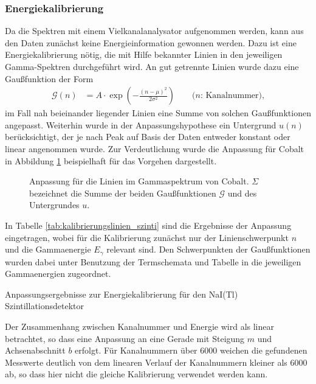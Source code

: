 \documentclass[11pt, a4paper]{article}
\numberwithin{equation}{section}
\begin{document}
\subsubsection{Energiekalibrierung}
\label{sec:kalibrierung_szinti}
Da die Spektren mit einem Vielkanalanalysator aufgenommen werden, kann aus den Daten zunächst keine Energieinformation gewonnen werden.
Dazu ist eine Energiekalibrierung nötig, die mit Hilfe bekannter Linien in den jeweiligen Gamma-Spektren durchgeführt wird.
An gut getrennte Linien wurde dazu eine Gaußfunktion der Form
\begin{align}
\mathcal{G}(n) &= A \cdot \exp\left( - \frac{(n - \mu)^2}{2 \sigma^2}\right) \qquad\text{($n$: Kanalnummer),}
\label{eq:gaussfithypothese}
\end{align}
im Fall nah beieinander liegender Linien eine Summe von solchen Gaußfunktionen angepasst.
Weiterhin wurde in der Anpassungshypothese ein Untergrund $u(n)$ berücksichtigt, der je nach Peak auf Basis der Daten entweder konstant oder linear angenommen wurde.
Zur Verdeutlichung wurde die Anpassung für Cobalt in Abbildung \ref{fig:fit_cobalt} beispielhaft für das Vorgehen dargestellt.
\begin{figure}[ht]
	\centering
	\resizebox{0.85\textwidth}{!}{
	
	}
	\caption{Anpassung für die Linien im Gammaspektrum von Cobalt. $\Sigma$ bezeichnet die Summe der beiden Gaußfunktionen $\mathcal{G}$ und des Untergrundes $u$.}
	\label{fig:fit_cobalt}
\end{figure}
In Tabelle \ref{tab:kalibrierungslinien_szinti} sind die Ergebnisse der Anpassung eingetragen, wobei für die Kalibrierung zunächst nur der Linienschwerpunkt $n$ und die Gammaenergie $E_\gamma$ relevant sind.
Den Schwerpunkten der Gaußfunktionen wurden dabei unter Benutzung der Termschemata und Tabelle in \cite{anleitung} die jeweiligen Gammaenergien zugeordnet.
\begin{table}[ht]
	\centering
	
	\caption{Anpassungsergebnisse zur Energiekalibrierung für den NaI(Tl) Szintillationsdetektor}
	\label{tab:kalibrierungslinien_szinti}
\end{table}
Der Zusammenhang zwischen Kanalnummer und Energie wird als linear betrachtet, so dass eine Anpassung an eine Gerade mit Steigung $m$ und Achsenabschnitt $b$ erfolgt.
Für Kanalnummern über \num{6000} weichen die gefundenen Messwerte deutlich von dem linearen Verlauf der Kanalnummern kleiner als \num{6000} ab, so dass hier nicht die gleiche Kalibrierung verwendet werden kann.
\end{document}
